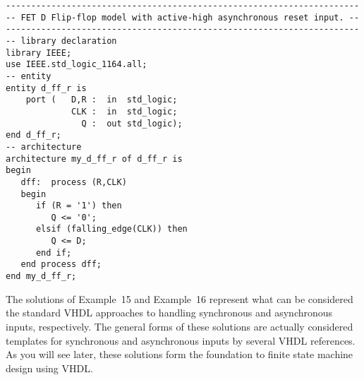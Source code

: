 \noindent
\begin{minipage}{0.99\linewidth}
\begin{lstlisting}[label=exe_16, caption=Solution to Example~16.]
----------------------------------------------------------------------
-- FET D Flip-flop model with active-high asynchronous reset input. --
----------------------------------------------------------------------
-- library declaration
library IEEE;
use IEEE.std_logic_1164.all;
-- entity
entity d_ff_r is 
    port (   D,R :  in  std_logic; 
             CLK :  in  std_logic; 
               Q :  out std_logic); 
end d_ff_r;
-- architecture
architecture my_d_ff_r of d_ff_r is 
begin
   dff:  process (R,CLK)
   begin
      if (R = '1') then 
         Q <= '0'; 
      elsif (falling_edge(CLK)) then 
         Q <= D; 
      end if; 
   end process dff; 
end my_d_ff_r; 
\end{lstlisting}
\end{minipage}
  
The solutions of Example~15 and Example~16 represent what can be considered the standard VHDL approaches to handling synchronous and asynchronous inputs, respectively. The general forms of these solutions are actually considered templates for synchronous and asynchronous inputs by several VHDL references. As you will see later, these solutions form the foundation to finite state machine design using VHDL.

